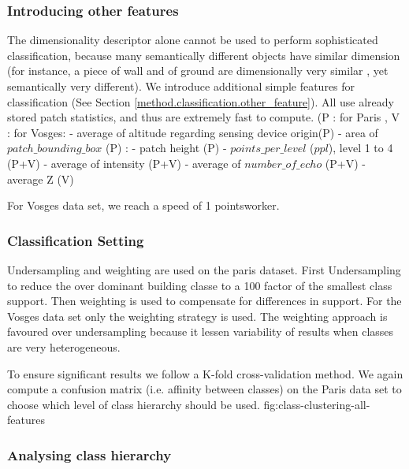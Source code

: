 		\subsubsection{Introducing other features}
		The dimensionality descriptor alone cannot be used to perform sophisticated classification,
		because many semantically different objects have similar dimension 
		(for instance, a piece of wall and of ground are dimensionally very similar
		, yet semantically very different).
		We introduce additional simple features for classification (See Section \ref{method.classification.other_feature}). All use already stored patch statistics, and thus are extremely fast to compute.
		(P : for Paris , V : for Vosges: 
		- average of altitude regarding sensing device origin(P)
		- area of $patch\_bounding\_box$ (P) : 
		- patch height (P)
		- $points\_per\_level$ ($ppl$), level 1 to 4 (P+V)
		- average of intensity (P+V)
		- average of $number\_of\_echo$ (P+V) 
		- average Z (V)
		
		For Vosges data set, we reach a speed of 1 \mega points\per \second \per worker.
		\subsubsection{Classification Setting} 
		Undersampling and weighting are used on the paris dataset. First Undersampling to reduce the over dominant building classe to a 100 factor of the smallest class support. Then weighting is used to compensate for differences in support. 
		For the Vosges data set only the weighting strategy is used. 
		The weighting approach is favoured over undersampling because it lessen variability of results when classes are very heterogeneous.
		
		To ensure significant results we follow a K-fold cross-validation method. We again compute a confusion matrix (i.e. affinity between classes) on the Paris data set to choose which level of class hierarchy should be used.
		fig:class-clustering-all-features
		
		
		\subsubsection{Analysing class hierarchy} 
		
